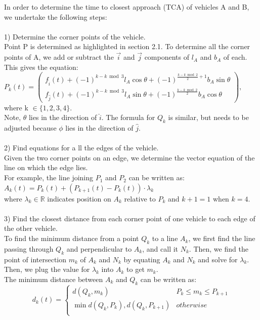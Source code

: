 \documentclass{article}
\begin{document}
In order to determine the time to closest approach (TCA) of vehicles A and B, we undertake the following steps:\\ \\
1) Determine the corner points of the vehicle.\\
Point P is determined as highlighted in section 2.1. To determine all the corner points of A, we add or subtract the $\vec{i}$ and $\vec{j}$ components of $l_A$ and $b_A$ of each. This gives the equation:\\
$P_k(t) = \begin{pmatrix}
f_{\hat{i}}(t) + (-1)^{k-k\bmod{3}} l_A\cos{\theta}+ (-1)^{\frac{k - k\bmod{2}}{2}+1} b_A \sin{\theta}\\
f_{\hat{j}}(t)+ (-1)^{k-k\bmod{3}} l_A\sin{\theta}+ (-1)^{\frac{k - k\bmod{2}}{2}} b_A \cos{\theta}
\end{pmatrix}$,\\
where k $\in \{1, 2, 3, 4\}.$\\
Note, $\theta$ lies in the direction of $\hat{i}$. The formula for $Q_k$ is similar, but needs to be adjusted because $\phi$ lies in the direction of $\hat{j}$.\\\\
2) Find equations for a ll the edges of the vehicle.\\
Given the two corner points on an edge, we determine the vector equation of the line on which the edge lies.\\
For example, the line joining $P_1$ and $P_2$ can be written as:\\
$A_k(t) = P_k(t) + (P_{k+1}(t)-P_k(t))\cdot\lambda_k$\\
where $\lambda_k\in\mathbb{R}$ indicates position on $A_k$ relative to $P_k$ and $k + 1 = 1$ when $k = 4$.
\\ \\
3) Find the closest distance from each corner point of one vehicle to each edge of the other vehicle.\\
To find the minimum distance from a point $Q_k$ to a line $A_k$, we first find the line passing through $Q_k$ and perpendicular to $A_k$, and call it $N_k$. Then, we find the point of intersection $m_k$ of $A_k$ and $N_k$ by equating $A_k$ and $N_k$ and solve for $\lambda_k$. Then, we plug the value for $\lambda_k$ into $A_k$ to get $m_k$.\\
The minimum distance between $A_k$ and $Q_k$ can be written as:\\
\[d_k(t) =   \left\{
\begin{array}{ll}
      d(Q_k, m_k) & P_k\leq m_k\leq P_{k+1}\\
      \min{d(Q_k, P_k), d(Q_k, P_{k+1})} & otherwise \\
\end{array} 
\right. \]\\
\end{document}
